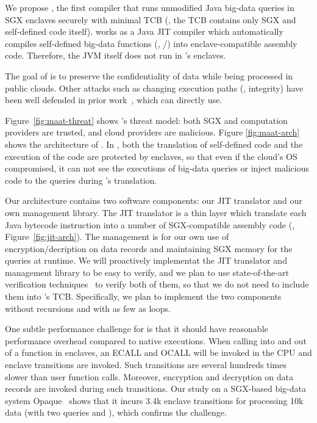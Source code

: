 We propose \maat, the first compiler that runs unmodified Java big-data queries 
in SGX enclaves securely with minimal TCB (\ie, the TCB contains only SGX and 
self-defined code itself). \maat works as a Java JIT compiler which 
automatically compiles self-defined big-data functions (\eg, 
/) into enclave-compatible assembly code. Therefore, the 
JVM itself does not run in \maat's enclaves.

The goal of \maat is to preserve the confidentiality of data while being 
processed in public clouds. Other attacks such as changing execution paths 
(\ie, integrity) have been well defended in prior work~\cite{jitguard:ccs17}, 
which \maat can directly use.

Figure~\ref{fig:maat-threat} shows \maat's threat model: both SGX and 
computation providers are trusted, and cloud providers are malicious. Figure 
\ref{fig:maat-arch} shows the architecture of \maat. In \maat, both the 
translation of self-defined code and the execution of the code are protected by 
enclaves, so that even if the cloud's OS compromised, it can not see the 
executions of big-data queries or inject malicious code to the queries during 
\maat's translation.

Our \maat architecture contains two software components: our JIT translator 
and our own management library. The JIT translator is a thin layer which 
translate each Java bytecode instruction into a number of SGX-compatible 
assembly code (\eg, Figure~\ref{fig:jit-arch}). The management is for our own 
use of encryption/decription on data records and maintaining SGX memory for the 
queries at runtime. We will proactively implementat the JIT translator and 
management library to be easy to verify, and we plan to use state-of-the-art 
verification techniques~\cite{xi:sosp17} to verify both of them, so 
that we do not need to include them into \maat's TCB. Specifically, we plan to 
implement the two components without recursions and with as few as loops.





One subtle performance challenge for \maat is that it should have reasonable 
performance overhead compared to native executions. When calling into and 
out of a function in enclaves, an ECALL and OCALL will be invoked in the CPU 
and enclave transitions are invoked. Such transitions are several hundreds 
times slower than user function calls. Moreover, encryption and decryption on 
data records are invoked during such transitions. Our study on a SGX-based 
big-data system Opaque~\cite{opaque:nsdi17} shows that it incurs 3.4k enclave
transitions for processing 10k data (with two queries  and 
), which confirms the challenge.

